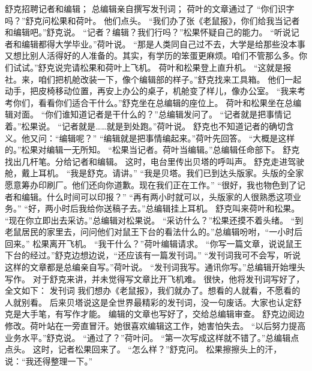 \documentclass[a4paper,12pt,UTF8,twoside]{ctexbook}
\begin{document}
        舒克招聘记者和编辑； 
        总编辑亲自撰写发刊词； 
        荷叶的文章通过了   
        “你们识字吗？”舒克问松果和荷叶。 
        他们点头。 
        “我们办了张《老鼠报》，你们给我当记者和编辑吧。”舒克说。 
        “记者？编辑？我们行吗？”松果怀疑自己的能力。 
        “听说记者和编辑都得大学毕业。”荷叶说。 
        “那是人类同自己过不去，大学是给那些没本事又想比别人活得好的人准备的。其实，有学历的笨蛋更麻烦。咱们不管那么多。你们试试。”舒克说完请松果和荷叶上飞机。 
        荷叶和松果登上直升机。 
        “这就是报社。来，咱们把机舱改装一下，像个编辑部的样子。”舒克找来工具箱。 
        他们一起动手，把皮椅移动位置，再安上办公的桌子，机舱变了样儿，像办公室。 
        “我来考考你们，看看你们适合干什么。”舒克坐在总编辑的座位上。 
        荷叶和松果坐在总编辑对面。 
        “你们谁知道记者是干什么的？”总编辑发问了。 
        “记者就是把事情记着。”松果说。 
        “记者就是……就是到处跑。”荷叶说。 
        舒克也不知道记者的确切含义。他又问：“编辑呢？” 
        “编辑就是把事情编起来。”荷叶先回答。 
        “大概是这样的。”松果对编辑一无所知。 
        “松果当记者。荷叶当编辑。”总编辑任命部下。 
        舒克找出几杆笔。分给记者和编辑。 
        这时，电台里传出贝塔的呼叫声。 
        舒克走进驾驶舱，戴上耳机。 
        “我是舒克。请讲。” 
        “我是贝塔。我们已到达头版家。头版的全家愿意筹办印刷厂。他们还向你道歉。现在我们正在工作。” 
        “很好，我也物色到了记者和编辑。什么时间可以印报？” 
        “再有两小时就可以，头版家的人很熟悉这项业务。” 
        “好，两小时后我给你送稿子去。”总编辑挂上耳机。 
        舒克叫来荷叶和松果。 
        “现在你立即出去采访。”总编辑对松果说。 
        “采访什么？”松果还摸不着头绪。 
        “到老鼠居民的家里去，问问他们对鼠王下台的看法什么的。”总编辑吩咐，“一小时后回来。” 
        松果离开飞机。 
        “我干什么？”荷叶编辑请求。 
        “你写一篇文章，说说鼠王下台的经过。”舒克边想边说，“还应该有一篇发刊词。” 
        “发刊词我可不会写，听说这样的文章都是总编亲自写。”荷叶说。 
        “发刊词我写。通讯你写。”总编辑开始埋头写作。 
        对于舒克来讲，并未觉得写文章比开飞机难。 
        很快，他将发刊词写好了，全文如下： 
        发刊词 
        我们想办《老鼠报》，我们就办了。想看的人就看，不愿看的人就别看。 
        后来贝塔说这是全世界最精彩的发刊词，没一句废话。大家也认定舒克是大手笔，有写作才能。 
        编辑的文章也写好了，交给总编辑审查。 
        舒克边阅边修改。荷叶站在一旁直冒汗。她很喜欢编辑这工作，她害怕失去。 
        “以后努力提高业务水平。”舒克说。 
        “通过了？”荷叶问。 
        “第一次写成这样就不错了。”总编辑点点头。 
        这时，记者松果回来了。 
        “怎么样？”舒克问。 
        松果擦擦头上的汗，说：“我还得整理一下。” 
\end{document}
